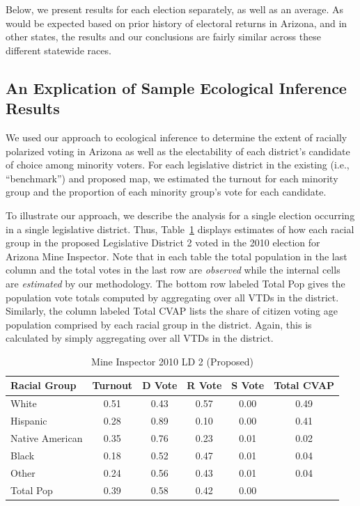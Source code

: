 \documentclass[12pt]{article}
\begin{document}
Below, we present results for each election separately, as well as an
average.  As would be expected based on prior history of electoral
returns in Arizona, and in other states, the results and our
conclusions are fairly similar across these different statewide races.

\subsection{An Explication of Sample Ecological Inference Results}

We used our approach to ecological inference to determine the extent
of racially polarized voting in Arizona as well as the electability of
each district's candidate of choice among minority voters. For each
legislative district in the existing (i.e., ``benchmark'') and
proposed map, we estimated the turnout for each minority group and the
proportion of each minority group's vote for each candidate. 

To illustrate our approach, we describe the analysis for a single
election occurring in a single legislative district. Thus,
Table~\ref{smine_cvap_ld_2_ex} displays estimates of how each racial
group in the proposed Legislative District 2 voted in the 2010
election for Arizona Mine Inspector. Note that in each table the total
population in the last column and the total votes in the last row are
{\it observed} while the internal cells are {\it estimated} by our
methodology. The bottom row labeled Total Pop gives the population
vote totals computed by aggregating over all VTDs in the district.
Similarly, the column labeled Total CVAP lists the share of citizen
voting age population comprised by each racial group in the district.
Again, this is calculated by simply aggregating over all VTDs in the
district.

\begin{table}[ht]
\begin{center}
\caption{\label{smine_cvap_ld_2_ex}Mine Inspector 2010 LD 2 (Proposed)}
\begin{tabular}{lccccc}
  \hline
Racial Group & Turnout & D Vote & R Vote & S Vote & Total CVAP \\ 
  \hline
White & 0.51 & 0.43 & 0.57 & 0.00 & 0.49 \\ 
  Hispanic & 0.28 & 0.89 & 0.10 & 0.00 & 0.41 \\ 
  Native American & 0.35 & 0.76 & 0.23 & 0.01 & 0.02 \\ 
  Black & 0.18 & 0.52 & 0.47 & 0.01 & 0.04 \\ 
  Other & 0.24 & 0.56 & 0.43 & 0.01 & 0.04 \\ 
  Total Pop & 0.39 & 0.58 & 0.42 & 0.00 &  \\ 
   \hline
\end{tabular}
\end{center}
\end{table}
\end{document}
